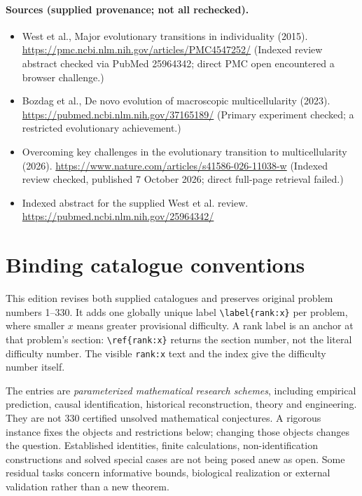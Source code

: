 \documentclass[11pt]{article}
\begin{document}
\paragraph{Sources (supplied provenance; not all rechecked).} \begin{itemize}
\item West et al., Major evolutionary transitions in individuality (2015). \url{https://pmc.ncbi.nlm.nih.gov/articles/PMC4547252/} (Indexed review abstract checked via PubMed 25964342; direct PMC open encountered a browser challenge.)
\item Bozdag et al., De novo evolution of macroscopic multicellularity (2023). \url{https://pubmed.ncbi.nlm.nih.gov/37165189/} (Primary experiment checked; a restricted evolutionary achievement.)
\item Overcoming key challenges in the evolutionary transition to multicellularity (2026). \url{https://www.nature.com/articles/s41586-026-11038-w} (Indexed review checked, published 7 October 2026; direct full-page retrieval failed.)
\item Indexed abstract for the supplied West et al. review. \url{https://pubmed.ncbi.nlm.nih.gov/25964342/}
\end{itemize}


\section*{Binding catalogue conventions}
This edition revises both supplied catalogues and preserves original problem numbers 1--330. It adds one globally unique label \verb|\label{rank:x}| per problem, where smaller $x$ means greater provisional difficulty. A rank label is an anchor at that problem's section: \verb|\ref{rank:x}| returns the section number, not the literal difficulty number. The visible \texttt{rank:x} text and the index give the difficulty number itself.

The entries are \emph{parameterized mathematical research schemes}, including empirical prediction, causal identification, historical reconstruction, theory and engineering. They are not 330 certified unsolved mathematical conjectures. A rigorous instance fixes the objects and restrictions below; changing those objects changes the question. Established identities, finite calculations, non-identification constructions and solved special cases are not being posed anew as open. Some residual tasks concern informative bounds, biological realization or external validation rather than a new theorem.
\end{document}
